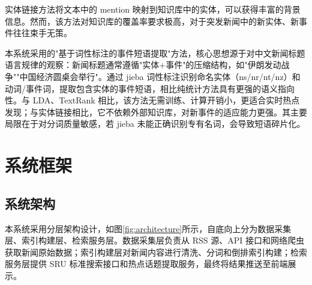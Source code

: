 \documentclass[UTF8,a4paper,zihao=5]{ctexart}
\begin{document}
实体链接方法将文本中的 mention 映射到知识库中的实体，可以获得丰富的背景信息。然而，该方法对知识库的覆盖率要求极高，对于突发新闻中的新实体、新事件往往束手无策。

本系统采用的"基于词性标注的事件短语提取"方法，核心思想源于对中文新闻标题语言规律的观察：新闻标题通常遵循"实体+事件"的压缩结构，如"伊朗发动战争""中国经济圆桌会举行"。通过 jieba 词性标注识别命名实体（ns/nr/nt/nz）和动词/事件词，提取包含实体的事件短语，相比纯统计方法具有更强的语义指向性。与 LDA、TextRank 相比，该方法无需训练、计算开销小，更适合实时热点发现；与实体链接相比，它不依赖外部知识库，对新事件的适应能力更强。其主要局限在于对分词质量敏感，若 jieba 未能正确识别专有名词，会导致短语碎片化。

\section{系统框架}

\subsection{系统架构}

本系统采用分层架构设计，如图\ref{fig:architecture}所示，自底向上分为数据采集层、索引构建层、检索服务层。数据采集层负责从 RSS 源、API 接口和网络爬虫获取新闻原始数据；索引构建层对新闻内容进行清洗、分词和倒排索引构建；检索服务层提供 SRU 标准搜索接口和热点话题提取服务，最终将结果推送至前端展示。
\end{document}
